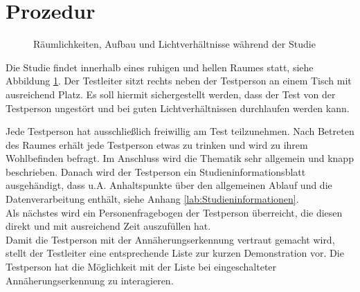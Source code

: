 \documentclass[a4paper,BCOR2mm,12pt,bibliography=totoc,listof=totoc,abstracton]{scrreprt}
\begin{document}
\section{Prozedur}
\begin{figure}
\centering
{}
\caption{Räumlichkeiten, Aufbau und Lichtverhältnisse während der Studie}
\label{prozedurumgebung}
\end{figure}
Die Studie findet innerhalb eines ruhigen und hellen Raumes statt, siehe Abbildung \ref{prozedurumgebung}. Der Testleiter sitzt rechts neben der Testperson an einem Tisch mit ausreichend Platz. Es soll hiermit sichergestellt werden, dass der Test von der Testperson ungestört und bei guten Lichtverhältnissen durchlaufen werden kann.

Jede Testperson hat ausschließlich freiwillig am Test teilzunehmen. Nach Betreten des Raumes erhält jede Testperson etwas zu trinken und wird zu ihrem Wohlbefinden befragt. Im Anschluss wird die Thematik sehr allgemein und knapp beschrieben. Danach wird der Testperson ein Studieninformationsblatt ausgehändigt, dass u.A. Anhaltspunkte über den allgemeinen Ablauf und die Datenverarbeitung enthält, siehe Anhang \ref{lab:Studieninformationen}.\\
Als nächstes wird ein Personenfragebogen der Testperson überreicht, die diesen direkt und mit ausreichend Zeit auszufüllen hat.\\
Damit die Testperson mit der Annäherungserkennung vertraut gemacht wird, stellt der Testleiter eine entsprechende Liste zur kurzen Demonstration vor. Die Testperson hat die Möglichkeit mit der Liste bei eingeschalteter Annäherungserkennung zu interagieren.
\end{document}

